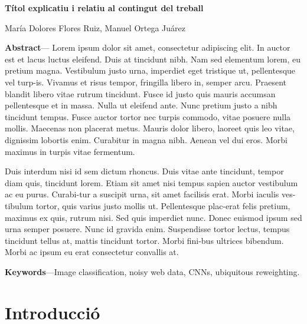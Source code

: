 ﻿\documentclass[10pt,a4paper,twocolumn,twoside]{article}
\begin{document}
{\sffamily
\noindent\textbf{\LARGE Títol explicatiu i relatiu al contingut del treball}
\begin{center}
María Dolores Flores Ruiz, Manuel Ortega Juárez
\end{center}

\bigskip
\bigskip

\noindent 
\textbf{Abstract}--- Lorem ipsum dolor sit amet, consectetur adipiscing elit. In auctor est et lacus luctus eleifend. Duis at tincidunt nibh. Nam sed elementum lorem, eu pretium magna. Vestibulum justo urna, imperdiet eget tristique ut, pellentesque vel turp-is. Vivamus et risus tempor, fringilla libero in, semper arcu. Praesent blandit libero vitae rutrum tincidunt. Fusce id justo quis mauris accumsan pellentesque et in massa. Nulla ut eleifend ante. Nunc pretium justo a nibh tincidunt tempus. Fusce auctor tortor nec turpis commodo, vitae posuere nulla mollis. Maecenas non placerat metus. Mauris dolor libero, laoreet quis leo vitae, dignissim lobortis enim. Curabitur in magna nibh. Aenean vel dui eros. Morbi maximus in turpis vitae fermentum.

Duis interdum nisi id sem dictum rhoncus. Duis vitae ante tincidunt, tempor diam quis, tincidunt lorem. Etiam sit amet nisi tempus sapien auctor vestibulum ac eu purus. Curabi-tur a suscipit urna, sit amet facilisis erat. Morbi iaculis ves-tibulum tortor, quis varius justo mollis ut. Pellentesque plac-erat felis pretium, maximus ex quis, rutrum nisi. Sed quis imperdiet nunc. Donec euismod ipsum sed urna semper posuere. Nunc id gravida enim. Suspendisse tortor lectus, tempus tincidunt tellus at, mattis tincidunt tortor. Morbi fini-bus ultrices bibendum. Morbi ac ipsum eu erat consectetur convallis at. 

\bigskip

\noindent 
\textbf{Keywords}---Image classification, noisy web data, CNNs, ubiquitous reweighting.
}
\bigskip

{\vrule depth 0pt height 0.5pt width 3cm\hspace{7.5pt}%
%
\hspace{7.5pt}\vrule depth 0pt height 0.5pt width 3cm\relax}

\bigskip


\section{Introducció}
\end{document}
